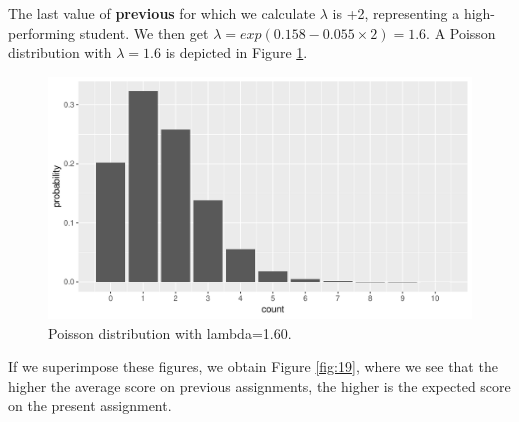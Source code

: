 \documentclass[]{report}\usepackage[]{graphicx}\usepackage[]{color}
\makeatletter
\def\maxwidth{ %
  \ifdim\Gin@nat@width>\linewidth
    \linewidth
  \else
    \Gin@nat@width
  \fi
}
\newenvironment{knitrout}{}{} %
\makeatother
\begin{document}
The last value of \textbf{previous} for which we calculate $\lambda$ is +2, representing a high-performing student. We then get $\lambda=exp(0.158  -0.055 \times 2)= 1.6$. A Poisson distribution with $\lambda=1.6$ is depicted in Figure \ref{fig:gen_18}.

\begin{knitrout}
\color{fgcolor}\begin{figure}

{\centering \includegraphics[width=\maxwidth]{figure/gen_18-1} 

}

\caption[Poisson distribution with lambda=1.60]{Poisson distribution with lambda=1.60.}\label{fig:gen_18}
\end{figure}


\end{knitrout}


If we superimpose these figures, we obtain Figure \ref{fig:19}, where we see that the higher the average score on previous assignments, the higher is the expected score on the present assignment.
\end{document}
